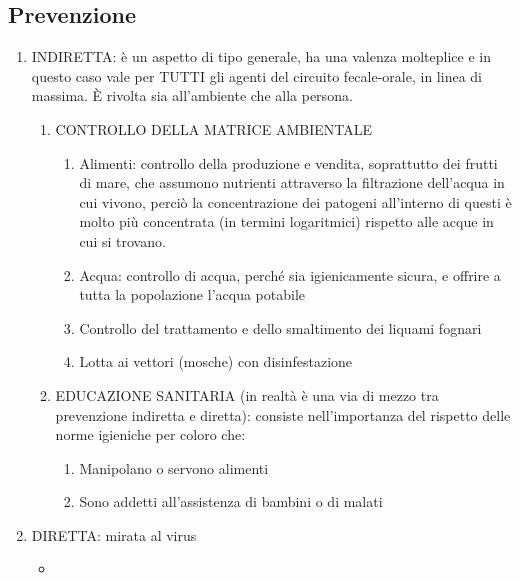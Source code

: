 \subsection{Prevenzione}


\begin{enumerate}
\def\labelenumi{\arabic{enumi}.}
\item
  INDIRETTA: è un aspetto di tipo generale, ha una valenza molteplice e
  in questo caso vale per TUTTI gli agenti del circuito fecale-orale, in
  linea di massima. È rivolta sia all'ambiente che alla persona.

  \begin{enumerate}
  \def\labelenumii{\alph{enumii}.}
  \item
    CONTROLLO DELLA MATRICE AMBIENTALE

    \begin{enumerate}
    \def\labelenumiii{\roman{enumiii}.}
    \item
      Alimenti: controllo della produzione e vendita, soprattutto dei
      frutti di mare, che assumono nutrienti attraverso la filtrazione
      dell'acqua in cui vivono, perciò la concentrazione dei patogeni
      all'interno di questi è molto più concentrata (in termini
      logaritmici) rispetto alle acque in cui si trovano.
    \item
      Acqua: controllo di acqua, perché sia igienicamente sicura, e
      offrire a tutta la popolazione l'acqua potabile
    \item
      Controllo del trattamento e dello smaltimento dei liquami fognari
    \item
      Lotta ai vettori (mosche) con disinfestazione
    \end{enumerate}
  \item
    EDUCAZIONE SANITARIA (in realtà è una via di mezzo tra prevenzione
    indiretta e diretta): consiste nell'importanza del rispetto delle
    norme igieniche per coloro che:

    \begin{enumerate}
    \def\labelenumiii{\roman{enumiii}.}
    \item
      Manipolano o servono alimenti
    \item
      Sono addetti all'assistenza di bambini o di malati
    \end{enumerate}
  \end{enumerate}
\item
  DIRETTA: mirata al virus


\begin{itemize}
\item
   

\end{itemize}
\end{enumerate}
